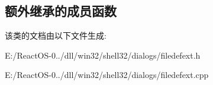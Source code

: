 \subsection*{额外继承的成员函数}


该类的文档由以下文件生成\+:\begin{DoxyCompactItemize}
\item 
E\+:/\+React\+O\+S-\/0../dll/win32/shell32/dialogs/filedefext.\+h\item 
E\+:/\+React\+O\+S-\/0../dll/win32/shell32/dialogs/filedefext.\+cpp\end{DoxyCompactItemize}
